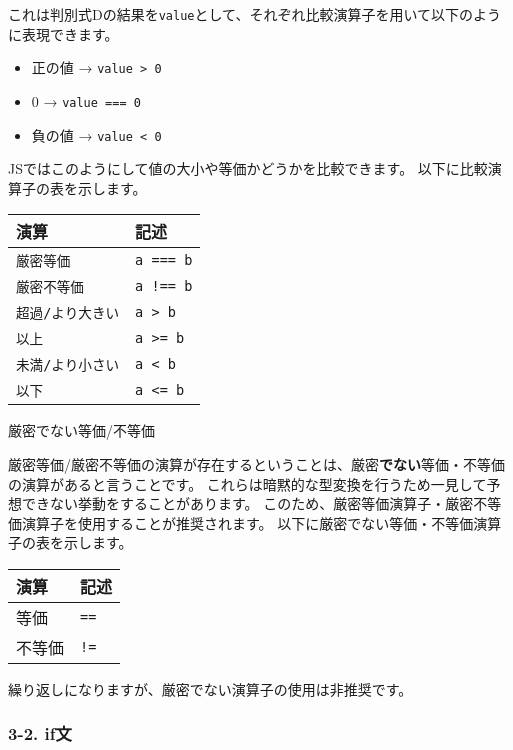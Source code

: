 これは判別式Dの結果を\texttt{value}として、それぞれ比較演算子を用いて以下のように表現できます。

\begin{itemize}
\tightlist
\item
  正の値 → \texttt{value\ \textgreater{}\ 0}
\item
  0 → \texttt{value\ ===\ 0}
\item
  負の値 → \texttt{value\ \textless{}\ 0}
\end{itemize}

JSではこのようにして値の大小や等価かどうかを比較できます。
以下に比較演算子の表を示します。

\begin{longtable}[]{@{}ll@{}}
\toprule\noalign{}
演算 & 記述 \\
\midrule\noalign{}
\endhead
\bottomrule\noalign{}
\endlastfoot
\texttt{厳密等価} & \texttt{a\ ===\ b} \\
\texttt{厳密不等価} & \texttt{a\ !==\ b} \\
\texttt{超過/より大きい} & \texttt{a\ \textgreater{}\ b} \\
\texttt{以上} & \texttt{a\ \textgreater{}=\ b} \\
\texttt{未満/より小さい} & \texttt{a\ \textless{}\ b} \\
\texttt{以下} & \texttt{a\ \textless{}=\ b} \\
\end{longtable}

厳密でない等価/不等価

厳密等価/厳密不等価の演算が存在するということは、厳密\textbf{でない}等価・不等価の演算があると言うことです。
これらは暗黙的な型変換を行うため一見して予想できない挙動をすることがあります。
このため、厳密等価演算子・厳密不等価演算子を使用することが推奨されます。
以下に厳密でない等価・不等価演算子の表を示します。

\begin{longtable}[]{@{}ll@{}}
\toprule\noalign{}
演算 & 記述 \\
\midrule\noalign{}
\endhead
\bottomrule\noalign{}
\endlastfoot
等価 & \texttt{==} \\
不等価 & \texttt{!=} \\
\end{longtable}

繰り返しになりますが、厳密でない演算子の使用は非推奨です。

\subsubsection{3-2. if文}\label{ifux6587}

